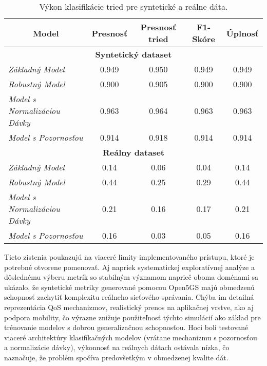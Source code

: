 \begin{table}[H]
\centering
\caption{Výkon klasifikácie tried pre syntetické a reálne dáta.}
\label{table:performance}
\begin{tabular}{|lcccc|}
\hline
\multicolumn{1}{|c|}{\textbf{Model}} & \multicolumn{1}{c|}{\textbf{Presnosť}} & \multicolumn{1}{c|}{\textbf{Presnosť tried}} & \multicolumn{1}{c|}{\textbf{F1-Skóre}} & \textbf{Úplnosť} \\ \hline
\multicolumn{5}{|c|}{\textbf{Syntetický dataset}} \\ \hline
\multicolumn{1}{|l|}{\textit{Základný Model}} & \multicolumn{1}{c|}{0.949} & \multicolumn{1}{c|}{0.950} & \multicolumn{1}{c|}{0.949} & 0.949 \\ \hline
\multicolumn{1}{|l|}{\textit{Robustný Model}} & \multicolumn{1}{c|}{0.900} & \multicolumn{1}{c|}{0.905} & \multicolumn{1}{c|}{0.900} & 0.900  \\ \hline
\multicolumn{1}{|l|}{\textit{Model s Normalizáciou Dávky}} & \multicolumn{1}{c|}{0.963} & \multicolumn{1}{c|}{0.964} & \multicolumn{1}{c|}{0.963} & 0.963 \\ \hline
\multicolumn{1}{|l|}{\textit{Model s Pozornosťou}} & \multicolumn{1}{c|}{0.914} & \multicolumn{1}{c|}{0.918} & \multicolumn{1}{c|}{0.914} & 0.914 \\ \hline
\multicolumn{5}{|c|}{\textbf{Reálny dataset}} \\ \hline
\multicolumn{1}{|l|}{\textit{Základný Model}} & \multicolumn{1}{c|}{0.14} & \multicolumn{1}{c|}{0.06} & \multicolumn{1}{c|}{0.04} & 0.14 \\ \hline
\multicolumn{1}{|l|}{\textit{Robustný Model}} & \multicolumn{1}{c|}{0.44} & \multicolumn{1}{c|}{0.25} & \multicolumn{1}{c|}{0.29} & 0.44 \\ \hline
\multicolumn{1}{|l|}{\textit{Model s Normalizáciou Dávky}} & \multicolumn{1}{c|}{0.21} & \multicolumn{1}{c|}{0.16} & \multicolumn{1}{c|}{0.17} & 0.21 \\ \hline
\multicolumn{1}{|l|}{\textit{Model s Pozornosťou}} & \multicolumn{1}{c|}{0.16} & \multicolumn{1}{c|}{0.03} & \multicolumn{1}{c|}{0.05} & 0.16 \\ \hline
\end{tabular}
\end{table}

Tieto zistenia poukazujú na viaceré limity implementovaného prístupu, ktoré je potrebné otvorene pomenovať. Aj napriek systematickej exploratívnej analýze a dôslednému výberu metrík so stabilným významom naprieč oboma doménami sa ukázalo, že syntetické metriky generované pomocou Open5GS majú obmedzenú schopnosť zachytiť komplexitu reálneho sieťového správania. Chýba im detailná reprezentácia QoS mechanizmov, realistický prenos na aplikačnej vrstve, ako aj podpora mobility, čo výrazne znižuje použiteľnosť týchto simulácií ako základ pre trénovanie modelov s dobrou generalizačnou schopnosťou. Hoci boli testované viaceré architektúry klasifikačných modelov (vrátane mechanizmu s pozornosťou a normalizácie dávky), výkonnosť na reálnych dátach ostávala nízka, čo naznačuje, že problém spočíva predovšetkým v obmedzenej kvalite dát. 

